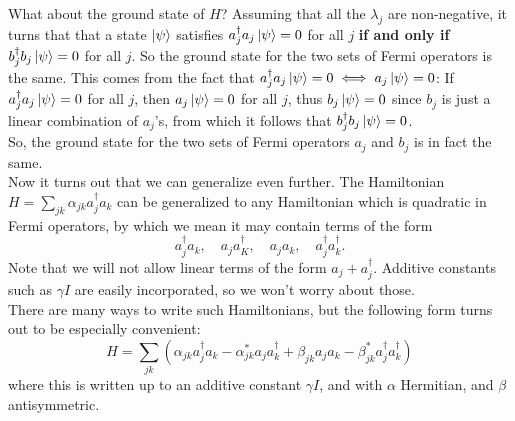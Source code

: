 \documentclass{book}
\theoremstyle{definition}
\newcommand{\al}{\alpha}
\newcommand{\be}{\beta}
\newcommand{\lp}{\left(}
\newcommand{\rp}{\right)}
\begin{document}
What about the ground state of $H$? Assuming that all the $\lambda_j$ are non-negative, it turns that that a state $\ket{\psi}$ satisfies $a_j^\dagger a_j \ket{\psi} = 0$ for all $j$ \textbf{if and only if} $b_j^\dagger b_j \ket{\psi} = 0$ for all $j$. So the ground state for the two sets of Fermi operators is the same. This comes from the fact that $a^\dagger_j a_j \ket{\psi} = 0 \iff a_j\ket{\psi} =0$: If $a_j^\dagger a_j \ket{\psi} = 0$ for all $j$, then $a_j\ket{\psi} = 0$ for all $j$, thus $b_j\ket{\psi} = 0$ since $b_j$ is just a linear combination of $a_j$'s, from which it follows that $b_j^\dagger b_j \ket{\psi} = 0$. \\

So, the ground state for the two sets of Fermi operators $a_j$ and $b_j$ is in fact the same. \\


Now it turns out that we can generalize even further. The Hamiltonian $H = \sum_{jk}\al_{jk}a_j^\dagger a_k$ can be generalized to any Hamiltonian which is quadratic in Fermi operators, by which we mean it may contain terms of the form 
\begin{equation}
a_j^\dagger a_k, \quad a_j a_K^\dagger, \quad a_ja_k, \quad a_j^\dagger a_k^\dagger.
\end{equation}
Note that we will not allow linear terms of the form $a_j + a_j^\dagger$. Additive constants such as $\gamma I $ are easily incorporated, so we won't worry about those. \\

There are many ways to write such Hamiltonians, but the following form turns out to be especially convenient:
\begin{equation}
\boxed{ H = \sum_{jk} \lp \al_{jk} a_j^\dagger a_k - \al_{jk}^* a_j a_k^\dagger + \be_{jk} a_j a_k - \be^*_{jk} a_j^\dagger a_k^\dagger \rp    }
\end{equation}
where this is written up to an additive constant $\gamma I$, and with $\al$ Hermitian, and $\be$ antisymmetric. \\
\end{document}

